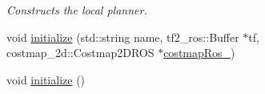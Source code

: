 \begin{DoxyCompactItemize}
\begin{DoxyCompactList}\small\item\em Constructs the local planner. \end{DoxyCompactList}\item 
void \hyperlink{classcl__move__base__z_1_1backward__local__planner_1_1BackwardLocalPlanner_a9a854ad7d93c5db2efda316358aa845c}{initialize} (std\+::string name, tf2\+\_\+ros\+::\+Buffer $\ast$tf, costmap\+\_\+2d\+::\+Costmap2\+D\+R\+OS $\ast$\hyperlink{classcl__move__base__z_1_1backward__local__planner_1_1BackwardLocalPlanner_a4136268882a105d9e06e173d85d5c0dc}{costmap\+Ros\+\_\+})
\item 
void \hyperlink{classcl__move__base__z_1_1backward__local__planner_1_1BackwardLocalPlanner_a5c9815019cef272faed835cd8c575196}{initialize} ()
\end{DoxyCompactItemize}
